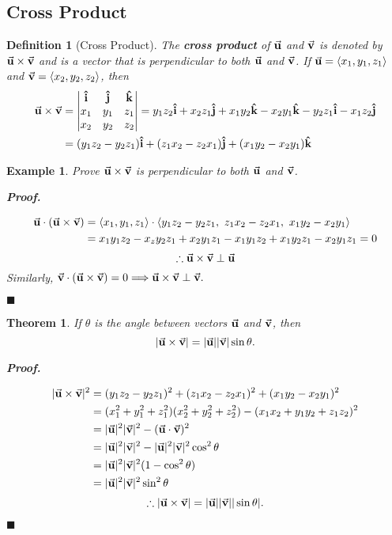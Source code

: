 \documentclass[12pt,a4paper]{article}
\newtheorem{thm}{Theorem}[subsection]
\newtheorem{df}{Definition}[subsection]
\newtheorem{eg}{Example}[subsection]
\newenvironment*{prf}{\par\indent\textbf{\textit{Proof. }}\par}{\par\hfill$\blacksquare$\par}
\def\vecv{\va{v}}
\def\vecu{\va{u}}
\def\veci{\vu{\boldsymbol{\textbf{i}}}}
\def\vecj{\vu{\boldsymbol{\textbf{j}}}}
\def\veck{\vu{\boldsymbol{\textbf{k}}}}
\begin{document}
\subsection{Cross Product}
\begin{df}[Cross Product]
	The \textbf{cross product} of $\vecu$ and $\vecv$ is denoted by $\vecu\times\vecv$ and is a vector that is perpendicular to both $\vecu$ and $\vecv$. If $\vecu=\langle x_1,y_1,z_1\rangle$ and $\vecv=\langle x_2,y_2,z_2\rangle$, then 
	\[\begin{aligned}
		\vecu\times\vecv&=\left|\begin{matrix}\veci&\vecj&\veck\\x_1&y_1&z_1\\x_2&y_2&z_2\end{matrix}\right|=y_1z_2\veci+x_2z_1\vecj+x_1y_2\veck-x_2y_1\veck-y_2z_1\veci-x_1z_2\vecj\\
		&=(y_1z_2-y_2z_1)\veci+(z_1x_2-z_2x_1)\vecj+(x_1y_2-x_2y_1)\veck
	\end{aligned}\]
\end{df}
\begin{eg}
	Prove $\vecu\times\vecv$ is perpendicular to both $\vecu$ and $\vecv$.
	\begin{prf}	
		\[\begin{aligned}
			\vecu\cdot(\vecu\times\vecv)&=\langle x_1,y_1,z_1\rangle\cdot\langle y_1z_2-y_2z_1,\ z_1x_2-z_2x_1,\ x_1y_2-x_2y_1\rangle\\
			&=x_1y_1z_2-x_zy_2z_1+x_2y_1z_1-x_1y_1z_2+x_1y_2z_1-x_2y_1z_1=0
		\end{aligned}\]
		\[\therefore \vecu\times\vecv\perp\vecu\]
		Similarly, $\vecv\cdot(\vecu\times\vecv)=0\Longrightarrow\vecu\times\vecv\perp\vecv.$
	\end{prf}
\end{eg}
\begin{thm}
	If $\theta$ is the angle between vectors $\vecu$ and $\vecv$, then \[|\vecu\times\vecv|=|\vecu||\vecv|\sin\theta.\]
	\begin{prf}
		\[\begin{aligned}
			|\vecu\times\vecv|^2&=(y_1z_2-y_2z_1)^2+(z_1x_2-z_2x_1)^2+(x_1y_2-x_2y_1)^2\\
			&=(x_1^2+y_1^2+z_1^2)(x_2^2+y_2^2+z_2^2)-(x_1x_2+y_1y_2+z_1z_2)^2\\
			&=|\vecu|^2|\vecv|^2-(\vecu\cdot\vecv)^2\\
			&=|\vecu|^2|\vecv|^2-|\vecu|^2|\vecv|^2\cos^2\theta\\
			&=|\vecu|^2|\vecv|^2(1-\cos^2\theta)\\
			&=|\vecu|^2|\vecv|^2\sin^2\theta
		\end{aligned}\]
		\[\therefore |\vecu\times\vecv|=|\vecu||\vecv||\sin\theta|.\]
	\end{prf}
\end{thm}
\end{document}
